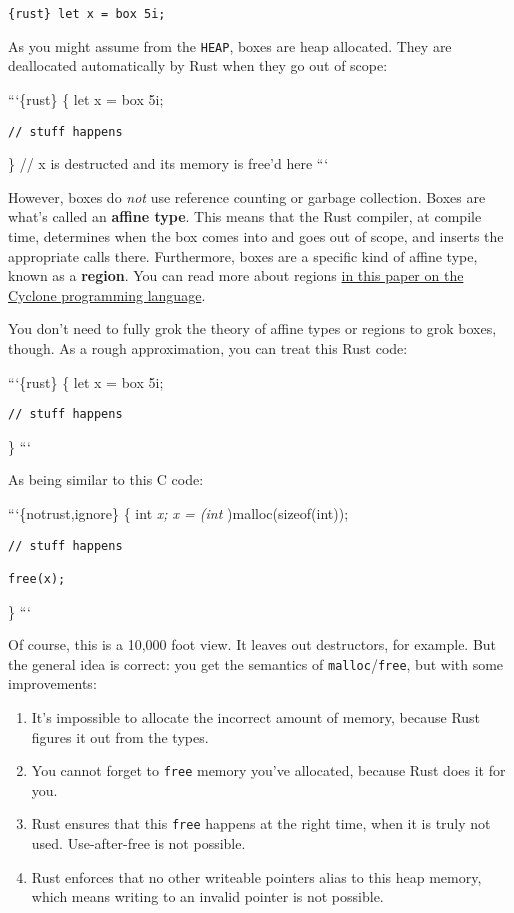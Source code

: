 \documentclass[]{article}
\begin{document}
\texttt{\{rust\} let x = box 5i;}

As you might assume from the \texttt{HEAP}, boxes are heap allocated.
They are deallocated automatically by Rust when they go out of scope:

```\{rust\} \{ let x = box 5i;

\begin{verbatim}
// stuff happens
\end{verbatim}

\} // x is destructed and its memory is free'd here ```

However, boxes do \emph{not} use reference counting or garbage
collection. Boxes are what's called an \textbf{affine type}. This means
that the Rust compiler, at compile time, determines when the box comes
into and goes out of scope, and inserts the appropriate calls there.
Furthermore, boxes are a specific kind of affine type, known as a
\textbf{region}. You can read more about regions
\href{http://www.cs.umd.edu/projects/cyclone/papers/cyclone-regions.pdf}{in
this paper on the Cyclone programming language}.

You don't need to fully grok the theory of affine types or regions to
grok boxes, though. As a rough approximation, you can treat this Rust
code:

```\{rust\} \{ let x = box 5i;

\begin{verbatim}
// stuff happens
\end{verbatim}

\} ```

As being similar to this C code:

```\{notrust,ignore\} \{ int \emph{x; x = (int })malloc(sizeof(int));

\begin{verbatim}
// stuff happens

free(x);
\end{verbatim}

\} ```

Of course, this is a 10,000 foot view. It leaves out destructors, for
example. But the general idea is correct: you get the semantics of
\texttt{malloc}/\texttt{free}, but with some improvements:

\begin{enumerate}
\def\labelenumi{\arabic{enumi}.}
\itemsep1pt\parskip0pt
\item
  It's impossible to allocate the incorrect amount of memory, because
  Rust figures it out from the types.
\item
  You cannot forget to \texttt{free} memory you've allocated, because
  Rust does it for you.
\item
  Rust ensures that this \texttt{free} happens at the right time, when
  it is truly not used. Use-after-free is not possible.
\item
  Rust enforces that no other writeable pointers alias to this heap
  memory, which means writing to an invalid pointer is not possible.
\end{enumerate}
\end{document}

